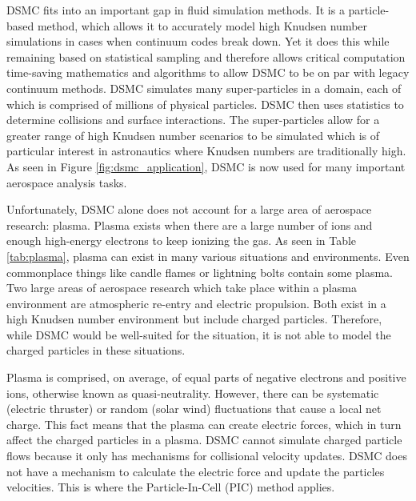 \indent DSMC fits into an important gap in fluid simulation methods. It is a particle-based method, which allows it to accurately model high Knudsen number simulations in cases when continuum codes break down. Yet it does this while remaining based on statistical sampling and therefore allows critical computation time-saving mathematics and algorithms to allow DSMC to be on par with legacy continuum methods. DSMC simulates many super-particles in a domain, each of which is comprised of millions of physical particles. DSMC then uses statistics to determine collisions and surface interactions. The super-particles allow for a greater range of high Knudsen number scenarios to be simulated which is of particular interest in astronautics where Knudsen numbers are traditionally high. As seen in Figure \ref{fig:dsmc_application}, DSMC is now used for many important aerospace analysis tasks. \par


\indent Unfortunately, DSMC alone does not account for a large area of aerospace research: plasma. Plasma exists when there are a large number of ions and enough high-energy electrons to keep ionizing the gas. As seen in Table \ref{tab:plasma}, plasma can exist in many various situations and environments. Even commonplace things like candle flames or lightning bolts contain some plasma. Two large areas of aerospace research which take place within a plasma environment are atmospheric re-entry and electric propulsion. Both exist in a high Knudsen number environment but include charged particles. Therefore, while DSMC would be well-suited for the situation, it is not able to model the charged particles in these situations. \par




\indent Plasma is comprised, on average, of equal parts of negative electrons and positive ions, otherwise known as quasi-neutrality. However, there can be systematic (electric thruster) or random (solar wind) fluctuations that cause a local net charge. This fact means that the plasma can create electric forces, which in turn affect the charged particles in a plasma. DSMC cannot simulate charged particle flows because it only has mechanisms for collisional velocity updates. DSMC does not have a mechanism to calculate the electric force and update the particles velocities. This is where the Particle-In-Cell (PIC) method applies. \par


